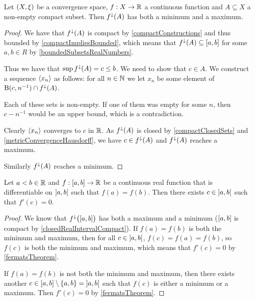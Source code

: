 \begin{theorem} \label{extremeValueTheorem}
Let $\left( X,\xi \right)$ be a convergence space, $f: X\to \mathbb{R}$ a continuous function and $A\subseteq X$ a non-empty compact subset. Then $f^\downarrow(A)$ has both a minimum and a maximum.
\end{theorem}
\begin{proof}
We have that $f^\downarrow(A)$ is compact by \ref{compactConstructions} and thus bounded by \ref{compactImpliesBounded}, which means that $f^\imf(A) \subseteq \interval{a,b}$ for some $a,b\in R$ by \ref{boundedSubsetsRealNumbers}.

Thus we have that $\sup f^{\downarrow}(A) = c \leq b$. We need to show that $c\in A$. We construct a sequence $\left\langle x_n \right\rangle$ as follows: for all $n\in \mathbb{N}$ we let $x_n$ be some element of $\operatorname{B}(c, n^{-1})\cap f^{\downarrow}(A)$.

Each of these sets is non-empty. If one of them was empty for some $n$, then $c-n^{-1}$ would be an upper bound, which is a contradiction.

Clearly $\left\langle x_n \right\rangle$ converges to $c$ in $\mathbb{R}$. As $f^\downarrow(A)$ is closed by \ref{compactClosedSets} and \ref{metricConvergenceHausdorff}, we have $c\in f^\downarrow(A)$ and $f^{\downarrow}(A)$ reaches a maximum.

Similarly $f^{\downarrow}(A)$ reaches a minimum.
\end{proof}
\begin{corollary} \label{RollesTheorem}
Let $a<b\in \mathbb{R}$ and $f: \interval{a,b}\to \R$ be a continuous real function that is differentiable on $\interval[o]{a,b}$ such that $f(a) = f(b)$. Then there exists $c\in \interval[o]{a,b}$ such that $f'(c) = 0$.
\end{corollary}
\begin{proof}
We know that $f^{\imf}\big(\interval{a,b}\big)$ has both a maximum and a minimum ($\interval{a,b}$ is compact by \ref{closedRealIntervalCompact}). If $f(a) = f(b)$ is both the minimum and maximum, then for all $c\in \interval[o]{a,b}$, $f(c) = f(a) = f(b)$, so $f(c)$ is both the minimum and maximum, which means that $f'(c) = 0$ by \ref{fermatsTheorem}.

If $f(a) = f(b)$ is not both the minimum and maximum, then there exists another $c\in \interval{a,b}\setminus\{a,b\} = \interval[o]{a,b}$ such that $f(c)$ is either a minimum or a maximum. Then $f'(c) = 0$ by \ref{fermatsTheorem}.
\end{proof}



